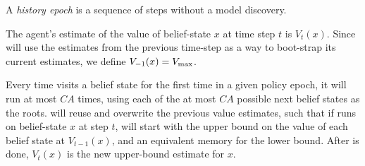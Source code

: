 \begin{defn}
A \emph{history epoch} is a sequence of steps without a model discovery.
\end{defn}

\begin{defn}
The agent's estimate of the value of belief-state $x$ at time step $t$ is $V_t(x)$. Since  will use the estimates from the previous time-step as a way to boot-strap its current estimates, we define $V_{-1}(x)=V_{\rm max}$.
\end{defn}

Every time  visits a belief state for the first time in a given policy epoch, it will run  at most $CA$ times, using each of the at most $CA$ possible next belief states as the roots.  will reuse and overwrite the previous value estimates, such that if  runs  on belief-state $x$ at step $t$,  will start with the upper bound on the value of each belief state at $V_{t-1}(x)$, and an equivalent memory for the lower bound. After  is done, $V_t(x)$ is the new upper-bound estimate for $x$.

